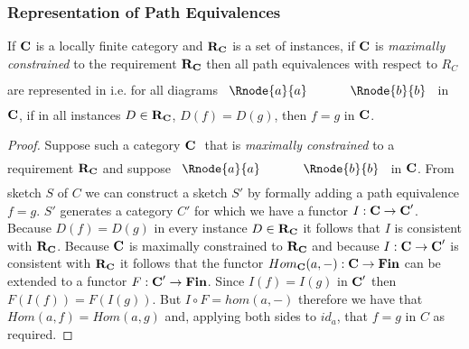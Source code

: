 \documentclass[10pt,a4paper]{article}
\theoremstyle{remark}
\renewcommand{\term}[1]{\textit{#1}}  %
\begin{document}
\subsubsection{Representation of Path Equivalences}

\begin{lemma}
If $\textbf{C}$ is a locally finite category and $\textbf{R}_{\textbf{C}}$ is a set of instances, if $\textbf{C}$ is 
\term{maximally constrained} to the requirement $\textbf{R}_{\textbf{C}}$ then all path equivalences with respect
to $R_C$ are represented in \catcw
i.e. for all diagrams
$
\rule[-0.3cm]{0pt}{0.9cm} %
\begin{array}{c p{0.5cm} c  }
 \Rnode{a}{a}            &&   \Rnode{b}{b}
\end{array} 
$
in $\textbf{C}$,  if in all instances $D \in \textbf{R}_{\textbf{C}}$, $D(f)=D(g)$, 
then $f=g$ in $\textbf{C}$.
\end{lemma}
\begin{proof}
Suppose such a category  $\textbf{C}\ $  that  is 
\term{maximally constrained} to a requirement $\textbf{R}_{\textbf{C}}$
and suppose 
$
\rule[-0.3cm]{0pt}{0.8cm} %
\begin{array}{c p{0.5cm} c  }
 \Rnode{a}{a}            &&   \Rnode{b}{b}
\end{array} 
$
in $\textbf{C}$. From sketch $S$ of $C$ we can construct a sketch $S'$ by formally adding a path equivalence $f=g$.
$S'$ generates a category $C'$ for which we have a functor $I: \textbf{C} \rightarrow \textbf{C}'$. 
Because $D(f) = D(g)$ in every instance $D \in \textbf{R}_{\textbf{C}}$
it follows that $I$ is consistent with $\textbf{R}_{\textbf{C}}$. Because $\textbf{C}$ is maximally constrained to $\textbf{R}_{\textbf{C}}$
and because $I: \textbf{C} \rightarrow \textbf{C}'$ is consistent with $\textbf{R}_{\textbf{C}}$ it follows that the functor $Hom_{\textbf{C}}(a,-): \textbf{C} \rightarrow \textbf{Fin}$ 
can be extended to a functor $F: \textbf{C}' \rightarrow \textbf{Fin}$. Since $I(f)=I(g)$ in $\textbf{C}'$ then $F(I(f))=F(I(g))$. But $I \circ F
= hom(a,-)$ therefore we have that $Hom(a,f)=Hom(a,g)$ and, applying both sides to $id_a$, that $f=g$ in $C$ as required.
\end{proof}
\end{document}
